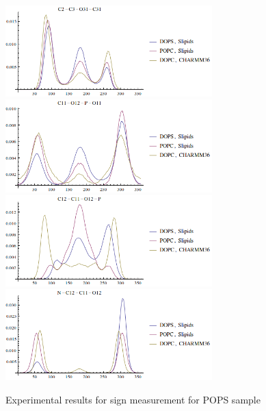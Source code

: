 \documentclass[aps,prl,superscriptaddress,twocolumn]{revtex4}
\begin{document}
\begin{figure}[]
  \includegraphics[width=8.0cm]{../Figs/dihed7.png}
  \includegraphics[width=8.0cm]{../Figs/dihed8.png}
  \includegraphics[width=8.0cm]{../Figs/dihed9.png}
  \includegraphics[width=8.0cm]{../Figs/dihed10.png}
  \caption{\label{dihedrals}
    Experimental results for sign measurement for POPS sample
  }
\end{figure}




\listoftodos
\end{document}
